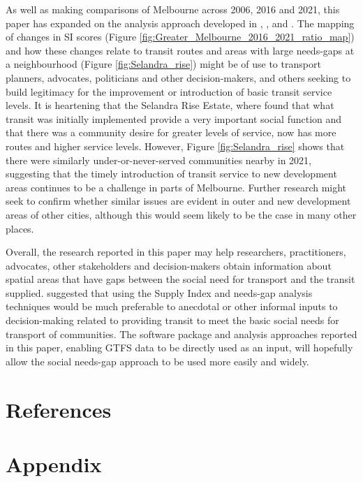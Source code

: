 \documentclass[preprint, 3p,
authoryear]{elsarticle} %
\begin{document}
As well as making comparisons of Melbourne across 2006, 2016 and 2021,
this paper has expanded on the analysis approach developed in
\citet{Currie2003Hobart}, \citet{Currie2004Gap},
\citet{Currie2007Identifying} and \citet{currie2010identifying}. The
mapping of changes in SI scores (Figure
\ref{fig:Greater_Melbourne_2016_2021_ratio_map}) and how these changes
relate to transit routes and areas with large needs-gaps at a
neighbourhood (Figure \ref{fig:Selandra_rise}) might be of use to
transport planners, advocates, politicians and other decision-makers,
and others seeking to build legitimacy for the improvement or
introduction of basic transit service levels. It is heartening that the
Selandra Rise Estate, where \citet{delbosc2015impact} found that what
transit was initially implemented provide a very important social
function and that there was a community desire for greater levels of
service, now has more routes and higher service levels. However, Figure
\ref{fig:Selandra_rise} shows that there were similarly
under-or-never-served communities nearby in 2021, suggesting that the
timely introduction of transit service to new development areas
continues to be a challenge in parts of Melbourne. Further research
might seek to confirm whether similar issues are evident in outer and
new development areas of other cities, although this would seem likely
to be the case in many other places.

Overall, the research reported in this paper may help researchers,
practitioners, advocates, other stakeholders and decision-makers obtain
information about spatial areas that have gaps between the social need
for transport and the transit supplied. \citet{currie2010identifying}
suggested that using the Supply Index and needs-gap analysis techniques
would be much preferable to anecdotal or other informal inputs to
decision-making related to providing transit to meet the basic social
needs for transport of communities. The software package and analysis
approaches reported in this paper, enabling GTFS data to be directly
used as an input, will hopefully allow the social needs-gap approach to
be used more easily and widely.

\section*{References}\label{references}

\section{Appendix}\label{appendix}
\end{document}
